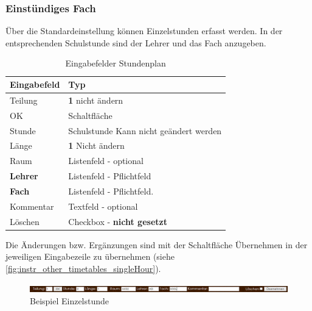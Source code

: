 \subsubsection{Einstündiges Fach} \label{sec:instr_other_timetables_single}
Über die Standardeinstellung können Einzelstunden erfasst werden. In der entsprechenden Schulstunde sind der Lehrer und das Fach anzugeben.
\begin{table}[H]
\centering
\begin{tabular}{p{3 cm}p{10 cm}}
   \toprule
   \textbf{Eingabefeld} & \textbf{Typ} \\
   \midrule
          Teilung & \textbf{1} \newline nicht ändern \\
          \hline
          OK & Schaltfläche \\
          \hline
          Stunde & Schulstunde \newline Kann nicht geändert werden\\
          \hline
          Länge & \textbf{1} \newline Nicht ändern \\
          \hline
          Raum & Listenfeld - optional \\
          \hline
          \textbf{Lehrer} & Listenfeld - Pflichtfeld \\
		  \hline
          \textbf{Fach} & Listenfeld - Pflichtfeld.\\
          \hline
          Kommentar & Textfeld - optional \\
          \hline
          Löschen & Checkbox - \textbf{nicht gesetzt}\\
   \bottomrule
\end{tabular}
\caption{Eingabefelder Stundenplan}
\end{table}
Die Änderungen bzw. Ergänzungen sind mit der Schaltfläche Übernehmen in der jeweiligen Eingabezeile zu übernehmen (siehe \autoref{fig:instr_other_timetables_singleHour}).
\begin{figure}[H]
\centering
\includegraphics[keepaspectratio=true, width=17cm]{images/screenshots/timetables_input_singleHour.png}
\caption{Beispiel Einzelstunde}
\label{fig:instr_other_timetables_singleHour}
\end{figure}
